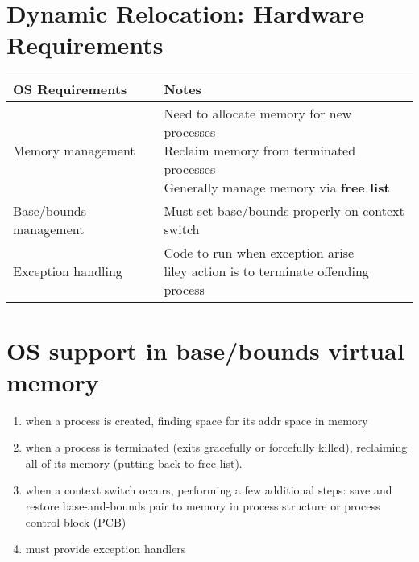 \section*{Dynamic Relocation: Hardware Requirements}
\begin{tabular}[th!]{p{3cm}p{6cm}}
  OS Requirements & Notes \\
  \hline
  Memory management & \parbox[t]{6cm}{Need to allocate memory for new processes\\
  Reclaim memory from terminated processes \\
  Generally manage memory via \textbf{free list}} \\
  \hline
  Base/bounds management & Must set base/bounds properly on context switch\\
  \hline
  Exception handling  & \parbox[t]{6cm}{Code to run when exception arise\\
  liley action is to terminate offending process} \\
  \hline
\end{tabular}
\section*{OS support in base/bounds virtual memory}
\begin{enumerate}
\item when a process is created, finding space for its addr space in memory
\item when a process is terminated (exits gracefully or forcefully killed), reclaiming all of its memory (putting back to free list).
\item when a context switch occurs, performing a few additional steps: save and restore base-and-bounds pair to memory in process structure or process control block (PCB)
\item must provide exception handlers
\end{enumerate}
